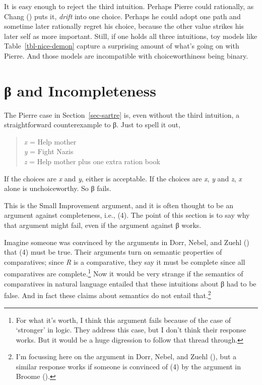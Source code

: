 \documentclass[
  11pt,
  letterpaper,
  DIV=11,
  numbers=noendperiod,
  twoside]{scrartcl}
\begin{document}
It is easy enough to reject the third intuition. Perhaps Pierre could
rationally, as Chang () puts it,
\emph{drift} into one choice. Perhaps he could adopt one path and
sometime later rationally regret his choice, because the other value
strikes his later self as more important. Still, if one holds all three
intuitions, toy models like Table~\ref{tbl-nice-demon} capture a
surprising amount of what's going on with Pierre. And those models are
incompatible with choiceworthiness being binary.

\section{β and Incompleteness}\label{sec-dorr}

The Pierre case in Section~\ref{sec-sartre} is, even without the third
intuition, a straightforward counterexample to β. Just to spell it out,

\begin{quote}
\emph{x} = Help mother\\
\emph{y} = Fight Nazis\\
\emph{z} = Help mother plus one extra ration book
\end{quote}

If the choices are \emph{x} and \emph{y}, either is acceptable. If the
choices are \emph{x}, \emph{y} and \emph{z}, \emph{x} alone is
unchoiceworthy. So β fails.

This is the Small Improvement argument, and it is often thought to be an
argument against completeness, i.e., (4). The point of this section is
to say why that argument might fail, even if the argument against β
works.

Imagine someone was convinced by the arguments in Dorr, Nebel, and Zuehl
() that (4) must be true. Their
arguments turn on semantic properties of comparatives; since \emph{R} is
a comparative, they say it must be complete since all comparatives are
complete.\footnote{For what it's worth, I think this argument fails
  because of the case of `stronger' in logic. They address this case,
  but I don't think their response works. But it would be a huge
  digression to follow that thread through.} Now it would be very
strange if the semantics of comparatives in natural language entailed
that these intuitions about β had to be false. And in fact these claims
about semantics do not entail that.\footnote{I'm focussing here on the
  argument in Dorr, Nebel, and Zuehl
  (), but a similar response works if
  someone is convinced of (4) by the argument in Broome
  ().}
\end{document}
